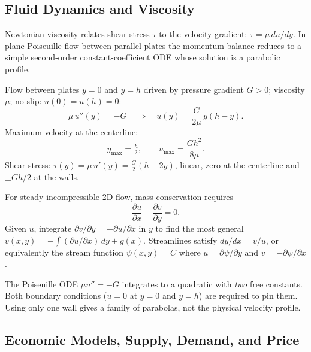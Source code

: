 \subsection{Fluid Dynamics and Viscosity}

Newtonian viscosity relates shear stress $\tau$ to the velocity gradient:
$\tau = \mu\,du/dy$. In plane Poiseuille flow between parallel plates the
momentum balance reduces to a simple second-order constant-coefficient ODE
whose solution is a parabolic profile.

\begin{formulabox}
Flow between plates $y=0$ and $y=h$ driven by pressure gradient $G > 0$;
viscosity $\mu$; no-slip: $u(0) = u(h) = 0$:
\[
  \mu\,u''(y) = -G \quad\Longrightarrow\quad
  u(y) = \frac{G}{2\mu}\,y(h - y).
\]
Maximum velocity at the centerline:
\[
  y_{\max} = \tfrac{h}{2}, \qquad
  u_{\max} = \frac{Gh^2}{8\mu}.
\]
Shear stress: $\tau(y) = \mu\,u'(y) = \tfrac{G}{2}(h - 2y)$, linear,
zero at the centerline and $\pm Gh/2$ at the walls.
\end{formulabox}

\begin{formulabox}
For steady incompressible 2D flow, mass conservation requires
\[
  \frac{\partial u}{\partial x} + \frac{\partial v}{\partial y} = 0.
\]
Given $u$, integrate $\partial v/\partial y = -\partial u/\partial x$ in $y$
to find the most general $v(x,y) = -\int(\partial u/\partial x)\,dy + g(x)$.
Streamlines satisfy $dy/dx = v/u$, or equivalently the stream function
$\psi(x,y) = C$ where $u = \partial\psi/\partial y$ and
$v = -\partial\psi/\partial x$.
\end{formulabox}

\begin{warningbox}
The Poiseuille ODE $\mu u'' = -G$ integrates to a quadratic with \emph{two}
free constants. Both boundary conditions ($u = 0$ at $y = 0$ and $y = h$) are
required to pin them. Using only one wall gives a family of parabolas, not the
physical velocity profile.
\end{warningbox}

\subsection{Economic Models, Supply, Demand, and Price}

